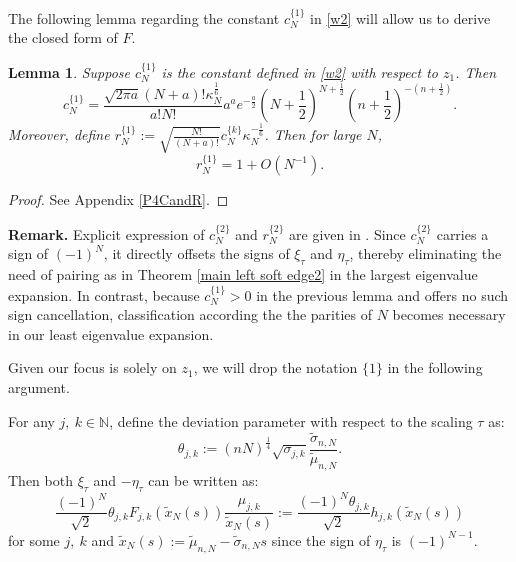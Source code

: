 \documentclass[11pt]{article}
\newtheorem{lemma}[theorem]{Lemma}
\numberwithin{equation}{section}%
\numberwithin{theorem}{section}
\begin{document}
The following lemma regarding the constant $c_N^{\{1\}}$ in \eqref{w2} will allow us to derive the closed form of $F$.
\begin{lemma}\label{c and r}
    Suppose $c^{\{1\}}_{N}$ is the constant defined in \eqref{w2} with respect to $z_1$. Then
 \begin{equation}\label{explicit4c}
     c^{\{1\}}_{N}=\frac{\sqrt{2\pi a}(N+a)!\kappa_N^\frac{1}{6}}{a!N!}a^ae^{-\frac{a}{2}}\left(N+\frac{1}{2}\right)^{N+\frac{1}{2}}\left(n+\frac{1}{2}\right)^{-\left(n+\frac{1}{2}\right)}.
 \end{equation}
 Moreover, define $r^{\{1\}}_{N}:=\sqrt{\frac{N!}{(N+a)!}}c^{\{k\}}_{N}\kappa_N^{-\frac{1}{6}}$. Then for large $N$,
 \begin{equation}\label{B4rN}
     r^{\{1\}}_{N}=1+O(N^{-1}).
 \end{equation}
\end{lemma}
\begin{proof}
    See Appendix \ref{P4CandR}.
\end{proof}
\bigskip\noindent\textbf{Remark.} Explicit expression of $c^{\{2\}}_{N}$ and $r^{\{2\}}_{N}$ are given in \cite{johnstone2001distribution}. Since $c^{\{2\}}_{N}$ carries a sign of $(-1)^N$, it directly offsets the signs of $\xi_\tau$ and $\eta_\tau$, thereby eliminating the need of pairing as in Theorem \ref{main left soft edge2} in the largest eigenvalue expansion. In contrast, because $c^{\{1\}}_{N}>0$ in the previous lemma and offers no such sign cancellation, classification according the the parities of $N$ becomes necessary in our least eigenvalue expansion.

Given our focus is solely on $z_1$, we will drop the notation $\{1\}$ in the following argument.

For any $j,~k\in\mathbb{N}$, define the deviation parameter with respect to the scaling $\tau$ as:
 \begin{equation*}
     \theta_{j,k}:=(nN)^\frac{1}{4}\sqrt{\sigma_{j,k}}\frac{\tilde{\sigma}_{n,N}}{\tilde{\mu}_{n,N}}.
 \end{equation*}
 Then both $\xi_\tau$ and $-\eta_\tau$ can be written as:
\begin{equation}\label{F2h}
   \frac{(-1)^N}{\sqrt2}\theta_{j,k}F_{j,k}(\tilde{x}_N(s))\frac{\mu_{j,k}}{\tilde{x}_N(s)}:=\frac{(-1)^N\theta_{j,k}}{\sqrt2}h_{j,k}(\tilde{x}_N(s))
\end{equation}
 for some $j,~k$ and $\tilde{x}_N(s):=\tilde\mu_{n,N}-\tilde\sigma_{n,N}s$ since the sign of $\eta_\tau$ is $(-1)^{N-1}$.
 
\end{document}
